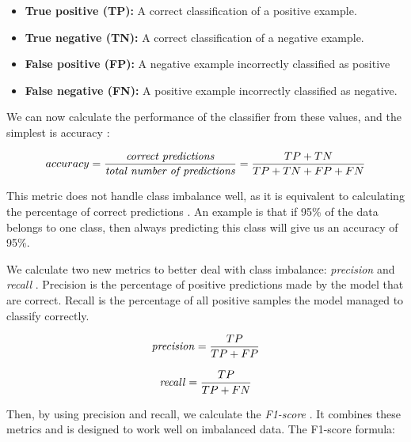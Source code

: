         \begin{itemize}
            \item \textbf{True positive (TP):} A correct classification of a positive example.
            \item \textbf{True negative (TN):} A correct classification of a negative example.
            \item \textbf{False positive (FP):} A negative example incorrectly classified as positive
            \item \textbf{False negative (FN):} A positive example incorrectly classified as negative.
            \end{itemize}
        
        We can now calculate the performance of the classifier from these values, and the simplest is accuracy \cite{powers2020evaluation_f1_recall_precision}:
        
        \begin{equation}
            accuracy = \dfrac{\textrm{\textit{correct predictions}}}{\textrm{\textit{total number of predictions}}} = \dfrac{TP+TN}{TP+TN+FP+FN} 
        \end{equation}
        
        This metric does not handle class imbalance well, as it is equivalent to calculating the percentage of correct predictions \cite{powers2020evaluation_f1_recall_precision}. An example is that if 95\% of the data belongs to one class, then always predicting this class will give us an accuracy of 95\%.
        
        We calculate two new metrics to better deal with class imbalance:  \textit{precision} and \textit{recall} \cite{powers2020evaluation_f1_recall_precision}. Precision is the percentage of positive predictions made by the model that are correct. Recall is the percentage of all positive samples the model managed to classify correctly.
        
        \begin{equation}
            \textrm{\textit{precision}} = \dfrac{TP}{TP+FP}
        \end{equation}
        
        \begin{equation}
            \textrm{\textit{recall}} = \dfrac{TP}{TP+FN}
        \end{equation}
        
        Then, by using precision and recall, we calculate the \textit{F1-score} \cite{powers2020evaluation_f1_recall_precision}. It combines these metrics and is designed to work well on imbalanced data. The F1-score formula: %
        
